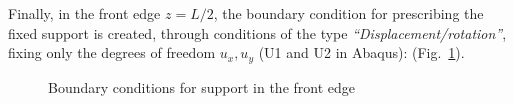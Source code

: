 \documentclass[english,a4paper,12pt]{article}
\begin{document}
Finally, in the front edge $z=L/2$, the boundary condition for prescribing the fixed support is created, through conditions of the type \emph{``Displacement/rotation''}, fixing only the degrees of freedom $u_{x}, u_{y}$ (U1 and U2 in Abaqus): (Fig.~\ref{fig:apoyo}).
\begin{figure}[h!tp]
\centering
{}
\caption{Boundary conditions for support in the front edge}
\label{fig:apoyo}
\end{figure}
\clearpage
\end{document}
